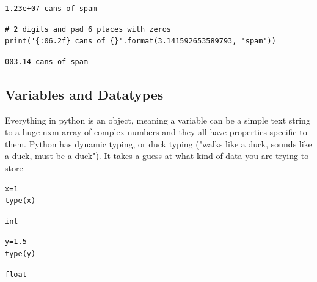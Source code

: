 \documentclass[%
oneside,                 %
final,                   %
10pt]{article}
\begin{document}
\begin{verbatim}
1.23e+07 cans of spam
\end{verbatim}


\begin{verbatim}
# 2 digits and pad 6 places with zeros
print('{:06.2f} cans of {}'.format(3.141592653589793, 'spam'))
\end{verbatim}

\begin{verbatim}
003.14 cans of spam
\end{verbatim}


\subsection{Variables and Datatypes}

 Everything in python is an object, meaning a variable can be a simple text string to a huge nxm array of complex numbers and they all have properties specific to them.
 Python has dynamic typing, or duck typing ("walks like a duck, sounds like a duck, must be a duck"). It takes a guess at what kind of data you are trying to store

\begin{verbatim}
x=1
type(x)
\end{verbatim}

\begin{verbatim}
int
\end{verbatim}


\begin{verbatim}
y=1.5
type(y)
\end{verbatim}

\begin{verbatim}
float
\end{verbatim}
\end{document}
